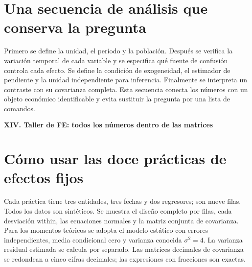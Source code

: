 \documentclass[11pt,a4paper]{article}
\theoremstyle{definition}
\newcommand{\parte}[1]{\par\bigskip\Needspace{8\baselineskip}\begin{center}{\Large\bfseries\color{azul}#1}\end{center}}
\begin{document}
\section{Una secuencia de análisis que conserva la pregunta}
Primero se define la unidad, el período y la población.
Después se verifica la variación temporal de cada variable y se especifica qué fuente de confusión controla cada efecto.
Se define la condición de exogeneidad, el estimador de pendiente y la unidad independiente para inferencia.
Finalmente se interpreta un contraste con su covarianza completa.
Esta secuencia conecta los números con un objeto económico identificable y evita sustituir la pregunta por una lista de comandos.



\parte{XIV. Taller de FE: todos los números dentro de las matrices}
\section{Cómo usar las doce prácticas de efectos fijos}
Cada práctica tiene tres entidades, tres fechas y dos regresores; son nueve filas. Todos los datos son sintéticos. Se muestra el diseño completo por filas, cada desviación within, las ecuaciones normales y la matriz conjunta de covarianza. Para los momentos teóricos se adopta el modelo estático con errores independientes, media condicional cero y varianza conocida $\sigma^2=4$. La varianza residual estimada se calcula por separado. Las matrices decimales de covarianza se redondean a cinco cifras decimales; las expresiones con fracciones son exactas.
\end{document}
